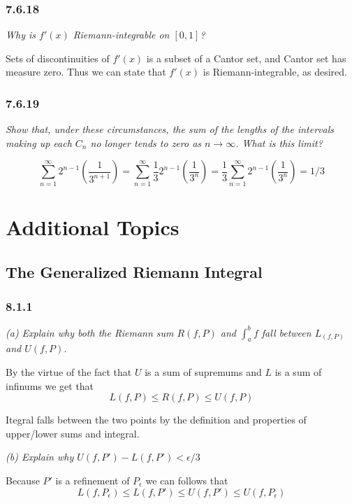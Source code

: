 \documentclass[11pt,oneside,titlepage]{book}
\begin{document}
\subsection*{7.6.18}

\textit{Why is $f'(x)$ Riemann-integrable on $[0, 1]$?}

Sets of discontinuities of $f'(x)$ is a subset of a Cantor set, and Cantor set
has measure zero. Thus we can state that $f'(x)$ is Riemann-integrable, as
desired.

\subsection*{7.6.19}
\textit{Show that, under these circumstances, the sum of the lengths of
  the intervals making up each $C_n$ no longer tends to zero as $n \to
  \infty$. What is this limit?}

$$\sum_{n = 1}^\infty{2^{n - 1}\left(\frac{1}{3^{n + 1}}\right)} =
\sum_{n = 1}^\infty{\frac{1}{3}2^{n - 1}\left(\frac{1}{3^{n}}\right)} =
\frac{1}{3} \sum_{n = 1}^\infty{2^{n - 1}\left(\frac{1}{3^{n}}\right)} =
1/3
$$ 


\chapter{Additional Topics}

\section{The Generalized Riemann Integral}

\subsection*{8.1.1}

\textit{(a) Explain why both the Riemann sum $R(f, P)$ and $\int_a^b f$ fall
  between $L_(f, P)$ and $U(f, P)$.}

By the virtue of the fact that $U$ is a sum of supremums and $L$ is a sum
of infinums we get that
$$L(f, P) \leq R(f, P) \leq U(f, P)$$

Itegral falls between the two points by the definition and properties of
upper/lower sums and integral.

\textit{(b) Explain why $U(f, P') - L(f, P') < \epsilon/3$}

Because $P'$ is a refinement of $P_\epsilon$ we can follows that
$$L(f, P_\epsilon) \leq L(f, P') \leq U(f, P') \leq U(f, P_\epsilon)$$
\end{document}
